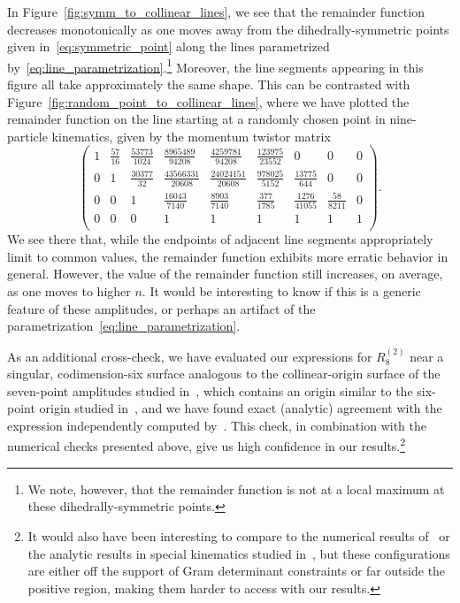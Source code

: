 \documentclass[11pt]{article}
\begin{document}
In Figure~\ref{fig:symm_to_collinear_lines}, we see that the remainder function decreases monotonically as one moves away from the dihedrally-symmetric points given in~\eqref{eq:symmetric_point} along the lines parametrized by~\eqref{eq:line_parametrization}.\footnote{We note, however, that the remainder function is not at a local maximum at these dihedrally-symmetric points.} Moreover, the line segments appearing in this figure all take approximately the same shape. This can be contrasted with Figure~\ref{fig:random_point_to_collinear_lines}, where we have plotted the remainder function on the line starting at a randomly chosen point in nine-particle kinematics, given by the momentum twistor matrix
\begin{equation} \label{eq:random_kinematic_point}
\left(
\begin{array}{ccccccccc}
 1 & \frac{57}{16} & \frac{53773}{1024} & \frac{8965489}{94208} & \frac{4259781}{94208} & \frac{123975}{23552} & 0 & 0 & 0 \\
 0 & 1 & \frac{30377}{32} & \frac{43566331}{20608} & \frac{24024151}{20608} & \frac{978025}{5152} & \frac{13775}{644} & 0 & 0 \\
 0 & 0 & 1 & \frac{16043}{7140} & \frac{8903}{7140} & \frac{377}{1785} & \frac{1276}{41055} & \frac{58}{8211} & 0 \\
 0 & 0 & 0 & 1 & 1 & 1 & 1 & 1 & 1 \\
\end{array}
\right).
\end{equation}
We see there that, while the endpoints of adjacent line segments appropriately limit to common values, the remainder function exhibits more erratic behavior in general. However, the value of the remainder function still increases, on average, as one moves to higher $n$. It would be interesting to know if this is a generic feature of these amplitudes, or perhaps an artifact of the parametrization~\eqref{eq:line_parametrization}.


As an additional cross-check, we have evaluated our expressions for $R^{(2)}_8$\! near a singular, codimension-six surface analogous to the collinear-origin surface of the seven-point amplitudes studied in~\cite{Dixon:2020cnr}, which contains an origin similar to the six-point origin studied in~\cite{Basso:2020xts}, and we have found exact (analytic) agreement with the expression independently computed by~\cite{Lance_to_appear}. This check, in combination with the numerical checks presented above, give us high confidence in our results.\footnote{It would also have been interesting to compare to the numerical results of~\cite{Anastasiou:2009kna,Brandhuber:2009da} or the analytic results in special kinematics studied in~\cite{DelDuca:2010zp,Heslop:2010kq,Gaiotto:2010fk}, but these configurations are either off the support of Gram determinant constraints or far outside the positive region, making them harder to access with our results.}
\end{document}

